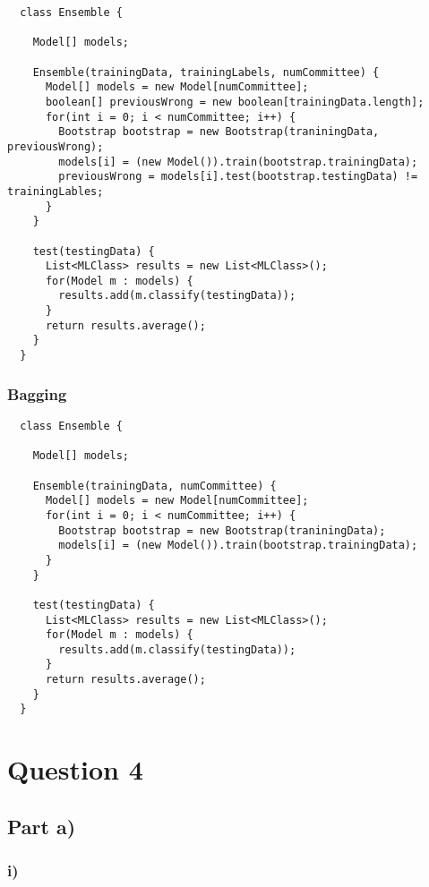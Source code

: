 \documentclass{article}
\begin{document}
\begin{verbatim}
  class Ensemble {

    Model[] models;

    Ensemble(trainingData, trainingLabels, numCommittee) {
      Model[] models = new Model[numCommittee];
      boolean[] previousWrong = new boolean[trainingData.length];
      for(int i = 0; i < numCommittee; i++) {
        Bootstrap bootstrap = new Bootstrap(traniningData, previousWrong);
        models[i] = (new Model()).train(bootstrap.trainingData);
        previousWrong = models[i].test(bootstrap.testingData) != trainingLables;
      }
    }

    test(testingData) {
      List<MLClass> results = new List<MLClass>();
      for(Model m : models) {
        results.add(m.classify(testingData));
      }
      return results.average();
    }
  }
\end{verbatim}

\subsubsection*{Bagging}

\begin{verbatim}
  class Ensemble {

    Model[] models;

    Ensemble(trainingData, numCommittee) {
      Model[] models = new Model[numCommittee];
      for(int i = 0; i < numCommittee; i++) {
        Bootstrap bootstrap = new Bootstrap(traniningData);
        models[i] = (new Model()).train(bootstrap.trainingData);
      }
    }

    test(testingData) {
      List<MLClass> results = new List<MLClass>();
      for(Model m : models) {
        results.add(m.classify(testingData));
      }
      return results.average();
    }
  }
\end{verbatim}

\section*{Question 4}

\subsection*{Part a)}

\subsubsection*{i)}
\end{document}
